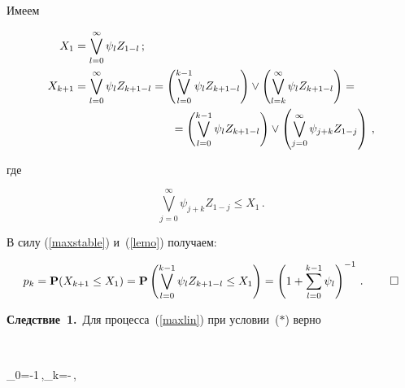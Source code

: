 Имеем 





\noindent


\begin{align*}


X_1&=\bigvee_{l=0}^\infty\psi_lZ_{1-l}\,;\\


X_{k+1}&=\bigvee_{l=0}^\infty\psi_lZ_{k+1-l}=


\left(\bigvee_{l=0}^{k-1}\psi_lZ_{k+1-l}\right)\vee


\left(\bigvee_{l=k}^\infty\psi_lZ_{k+1-l}\right)={}\\


&\hspace*{30mm}{}=


\left(\bigvee_{l=0}^{k-1}\psi_lZ_{k+1-l}\right)\vee\left(\bigvee_{j=0}^\infty\psi_{j+k}Z_{1-j}\right)\,,


\end{align*}


где





\noindent


$$


\bigvee_{j=0}^\infty\psi_{j+k}Z_{1-j}\le X_1\,.


$$


В силу (\ref{maxstable}) и~(\ref{lemo}) получаем:





\noindent


$$


p_k={\bf P}(X_{k+1}\le X_1)={\bf P}\left(\bigvee_{l=0}^{k-1}


\psi_lZ_{k+1-l}\le X_1\right)=


\left(1+\sum\limits_{l=0}^{k-1}\psi_l\right)^{-1}\,.~~~~~~~\square


$$








\noindent


\textbf{Следствие~1.}\ Для процесса~(\ref{maxlin}) при условии~{\rm ($*$)} верно





\noindent


$$


\psi_0=-1\,,\quad \psi_k=-\,,


